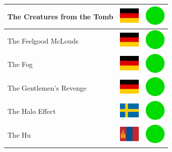 \documentclass[12pt, a4paper, twoside]{report}
\begin{document}
\begin{center}
\begin{longtable}{|p{5cm}|p{2cm}|p{2cm}|}
The Creatures from the Tomb & \includegraphics[width=1cm]{4x3/de} & \includegraphics[width=1cm]{likes/y} \\ \hline
The Feelgood McLouds & \includegraphics[width=1cm]{4x3/de} & \includegraphics[width=1cm]{likes/y} \\ \hline
The Fog & \includegraphics[width=1cm]{4x3/de} & \includegraphics[width=1cm]{likes/y} \\ \hline
The Gentlemen's Revenge & \includegraphics[width=1cm]{4x3/de} & \includegraphics[width=1cm]{likes/y} \\ \hline
The Halo Effect & \includegraphics[width=1cm]{4x3/se} & \includegraphics[width=1cm]{likes/y} \\ \hline
The Hu & \includegraphics[width=1cm]{4x3/mn} & \includegraphics[width=1cm]{likes/y} \\ \hline

\end{longtable}
\end{center}
\end{document}
